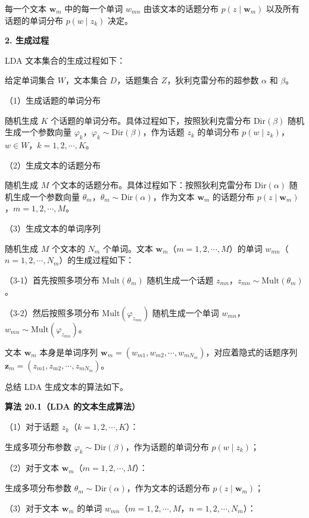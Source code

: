 \documentclass[UTF8, 12pt, fontset=fandol, oneside]{ctexart}
\begin{document}
每一个文本 $\mathbf{w}_m$ 中的每一个单词 $w_{mn}$ 由该文本的话题分布 $p(z\mid \mathbf{w}_m)$ 以及所有话题的单词分布 $p(w\mid z_k)$ 决定。

\noindent\textbf{2. 生成过程}

LDA 文本集合的生成过程如下：

给定单词集合 $W$，文本集合 $D$，话题集合 $Z$，狄利克雷分布的超参数 $\alpha$ 和 $\beta$。

（1）生成话题的单词分布

随机生成 $K$ 个话题的单词分布。具体过程如下，按照狄利克雷分布 $\mathrm{Dir}(\beta)$ 随机生成一个参数向量 $\varphi_k$，$\varphi_k\sim \mathrm{Dir}(\beta)$，作为话题 $z_k$ 的单词分布 $p(w\mid z_k)$，$w\in W$，$k=1,2,\cdots,K$。

（2）生成文本的话题分布

随机生成 $M$ 个文本的话题分布。具体过程如下：按照狄利克雷分布 $\mathrm{Dir}(\alpha)$ 随机生成一个参数向量 $\theta_m$，$\theta_m\sim \mathrm{Dir}(\alpha)$，作为文本 $\mathbf{w}_m$ 的话题分布 $p(z\mid \mathbf{w}_m)$，$m=1,2,\cdots,M$。

（3）生成文本的单词序列

随机生成 $M$ 个文本的 $N_m$ 个单词。文本 $\mathbf{w}_m$（$m=1,2,\cdots,M$）的单词 $w_{mn}$（$n=1,2,\cdots,N_m$）的生成过程如下：

（3-1）首先按照多项分布 $\mathrm{Mult}(\theta_m)$ 随机生成一个话题 $z_{mn}$，$z_{mn}\sim \mathrm{Mult}(\theta_m)$。

（3-2）然后按照多项分布 $\mathrm{Mult}(\varphi_{z_{mn}})$ 随机生成一个单词 $w_{mn}$，$w_{mn}\sim \mathrm{Mult}(\varphi_{z_{mn}})$。

文本 $\mathbf{w}_m$ 本身是单词序列 $\mathbf{w}_m=(w_{m1},w_{m2},\cdots,w_{mN_m})$，对应着隐式的话题序列 $\mathbf{z}_m=(z_{m1},z_{m2},\cdots,z_{mN_m})$。

总结 LDA 生成文本的算法如下。

\noindent\textbf{算法 20.1（LDA 的文本生成算法）}

（1）对于话题 $z_k$（$k=1,2,\cdots,K$）：

生成多项分布参数 $\varphi_k\sim \mathrm{Dir}(\beta)$，作为话题的单词分布 $p(w\mid z_k)$；

（2）对于文本 $\mathbf{w}_m$（$m=1,2,\cdots,M$）：

生成多项分布参数 $\theta_m\sim \mathrm{Dir}(\alpha)$，作为文本的话题分布 $p(z\mid \mathbf{w}_m)$；

（3）对于文本 $\mathbf{w}_m$ 的单词 $w_{mn}$（$m=1,2,\cdots,M$，$n=1,2,\cdots,N_m$）：
\end{document}

